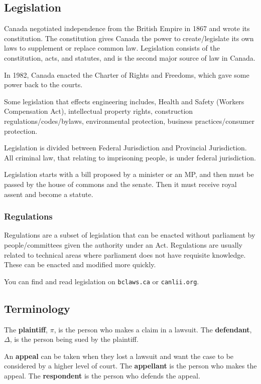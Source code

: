 \documentclass{article}
\begin{document}
\subsection{Legislation}

Canada negotiated independence from the British Empire in 1867 and wrote its constitution. The constitution gives Canada the power to create/legislate its own laws to supplement or replace common law. Legislation  consists of the constitution, acts, and statutes, and is the second major source  of law in Canada.

In 1982, Canada enacted the Charter of Rights and Freedoms, which gave some power back to the courts.

Some legislation that effects engineering includes, Health and Safety (Workers Compensation Act), intellectual property rights, construction regulations/codes/bylaws, environmental protection, business practices/consumer protection.

Legislation is divided between Federal Jurisdiction and Provincial Jurisdiction. All criminal law, that relating to imprisoning people, is under federal jurisdiction.

Legislation starts with a bill proposed by a minister or an MP, and then must be passed by the house of commons and the senate. Then it must receive royal assent and become a statute.

\subsubsection{Regulations}

Regulations are a subset of legislation that can be enacted without parliament by people/committees given the authority under an Act. Regulations are usually related to technical areas where parliament does not have requisite knowledge. These can be enacted and modified more quickly.

You can find and read legislation on \texttt{bclaws.ca} or \texttt{canlii.org}.

\subsection{Terminology}

The \textbf{plaintiff}, $\pi$, is the person  who makes a claim in a lawsuit. The \textbf{defendant}, $\Delta$, is the person being sued by the plaintiff.

An \textbf{appeal} can be taken when they lost a lawsuit and want the case to be considered by a higher level of court. The \textbf{appellant} is the person who makes the appeal. The \textbf{respondent} is the person who defends the appeal.
\end{document}
